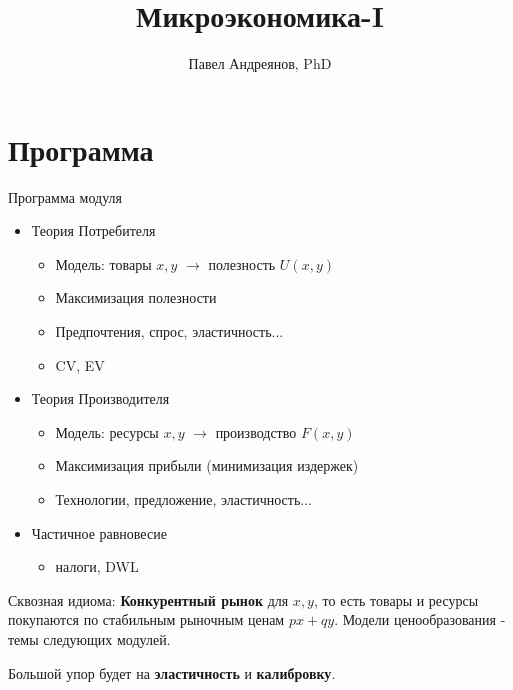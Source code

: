\documentclass{beamer}
\title{
Микроэкономика-I
}
\author{
Павел Андреянов, PhD
}
\begin{document}
\maketitle

\section{Программа}

\begin{frame}{Программа модуля}
\begin{itemize}
\item Теория Потребителя
\begin{itemize}
\item Модель: товары $x, y$ $\to$ полезность $U(x,y)$
\item Максимизация полезности
\item Предпочтения, спрос, эластичность...
\item CV, EV
\end{itemize}
\item Теория Производителя
\begin{itemize}
\item Модель: ресурсы $x, y$ $\to$ производство $F(x,y)$
\item Максимизация прибыли (минимизация издержек)
\item Технологии, предложение, эластичность...
\end{itemize}
\item Частичное равновесие
\begin{itemize}
\item налоги, DWL
\end{itemize}
\end{itemize}
\end{frame}

\begin{frame}

Сквозная идиома: \textbf{Конкурентный рынок} для $x,y$, то есть товары и ресурсы покупаются по стабильным рыночным ценам $px + qy$. Модели ценообразования - темы следующих модулей.

Большой упор будет на \textbf{эластичность} и \textbf{калибровку}.
\end{frame}
\end{document}
